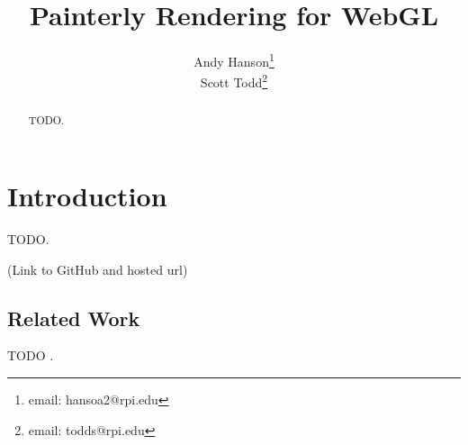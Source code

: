 \documentclass[conference]{acmsiggraph}
\title{Painterly Rendering for WebGL}
\author{Andy Hanson\thanks{email: hansoa2@rpi.edu}\\
        Scott Todd\thanks{email: todds@rpi.edu}}
\begin{document}

\maketitle

\begin{abstract}

TODO.

\end{abstract}



\keywordlist


\TOGlinkslist


\copyrightspace

\section{Introduction}

TODO.

(Link to GitHub and hosted url)

\subsection{Related Work}

TODO \cite{Meier:1996:PRA:237170.237288}.
\end{document}
